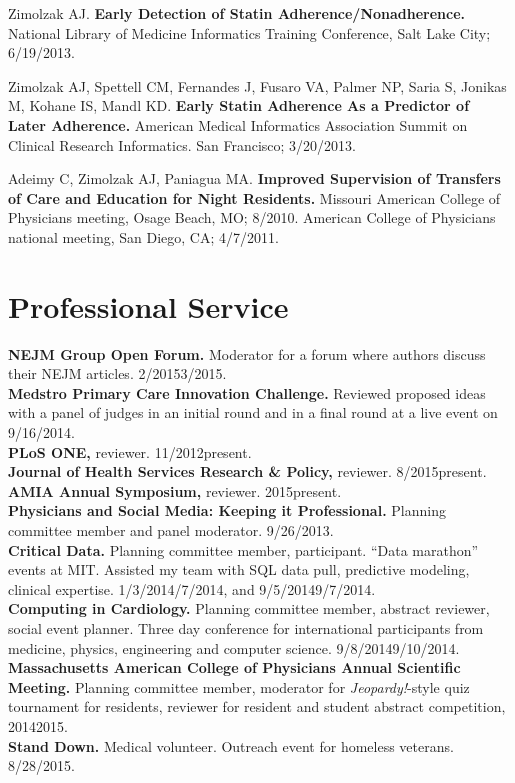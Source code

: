 \documentclass[10pt]{article}
\begin{document}
Zimolzak AJ. \textbf{Early Detection of Statin
  Adherence/Nonadherence.} National Library of Medicine Informatics
Training Conference, Salt Lake City; 6/19/2013.

Zimolzak AJ, Spettell CM, Fernandes J, Fusaro VA, Palmer NP, Saria S,
Jonikas M, Kohane IS, Mandl KD. \textbf{Early Statin Adherence As a
  Predictor of Later Adherence.} American Medical Informatics
Association Summit on Clinical Research Informatics. San Francisco;
3/20/2013.

Adeimy C, Zimolzak AJ, Paniagua MA. \textbf{Improved Supervision of
  Transfers of Care and Education for Night Residents.} Missouri
American College of Physicians meeting, Osage Beach, MO; 8/2010.
American College of Physicians national meeting, San Diego, CA;
4/7/2011.

\section*{Professional Service}

\textbf{NEJM Group Open Forum.} Moderator for a forum where
authors discuss their NEJM articles. 2/2015\ndash{}3/2015.\\
\textbf{Medstro Primary Care Innovation Challenge.} Reviewed proposed
ideas with a panel of judges in an initial round and in a final round
at a live event on 9/16/2014.\\
\textbf{PLoS ONE,} reviewer. 11/2012\ndash{}present.\\
\textbf{Journal of Health Services Research \& Policy,} reviewer.
8/2015\ndash{}present.\\
\textbf{AMIA Annual Symposium,} reviewer. 2015\ndash{}present.\\
\textbf{Physicians and Social Media: Keeping it Professional.} Planning committee member and panel moderator. 9/26/2013.\\
\textbf{Critical Data.} Planning committee member, participant. “Data
marathon” events at MIT. Assisted my team with SQL data pull,
predictive modeling, clinical expertise.
1/3/2014\ndash{}/7/2014, and 9/5/2014\ndash{}9/7/2014.\\
\textbf{Computing in Cardiology.} Planning committee member, abstract
reviewer, social event planner. Three day conference for international
participants from medicine, physics, engineering and computer science.
9/8/2014\ndash{}9/10/2014.\\
\textbf{Massachusetts American College of Physicians Annual Scientific
  Meeting.} Planning committee member, moderator for
\emph{Jeopardy!}-style quiz tournament for residents, reviewer for resident and student abstract competition, 2014\ndash{}2015.\\
\textbf{Stand Down.} Medical volunteer. Outreach event for homeless
veterans. 8/28/2015.
\end{document}
